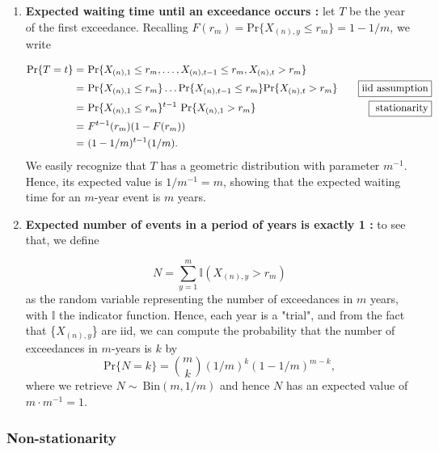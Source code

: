 \begin{enumerate}
	\item \textbf{Expected waiting time until an exceedance occurs :} let $T$ be the year of the first exceedance. Recalling $F(r_m) = \text{Pr} \big\{X_{(n),y}\leq r_m\big\}=1-1/m$, we write
	
	\begin{equation*}
	\begin{aligned}
	\text{Pr}\{T=t\}=\  & \text{Pr}\{X_{(n),1}\leq r_m,\dots,X_{(n),t-1}\leq r_m,X_{(n),t}>r_m\} \\
	=\ & \text{Pr}\{X_{(n),1}\leq r_m\}\dots\text{Pr}\{X_{(n),t-1}\leq r_m\}\text{Pr}\{X_{(n),t}>r_m\}&  \quad  \boxed{\textnormal{iid assumption}}\\
	= \ & \text{Pr}\{X_{(n),1}\leq r_m\}^{t-1}\ \text{Pr}\{X_{(n),1}>r_m\} &  \quad \boxed{\text{ stationarity}}\\
	=\ & F^{t-1}(r_m)(1-F(r_m))\\
	=\ & (1-1/m)^{t-1}(1/m).
	\end{aligned}
	\end{equation*}
	We easily recognize that $T$ has a geometric distribution with parameter $m^{-1}$. Hence, its expected value is $1/m^{-1}=m$, showing that the expected waiting time for an $m$-year event is $m$ years.
	
	\item \textbf{Expected number of events in a period of  years is exactly 1 :} to see that, we define  
	
	\begin{equation*}N=\sum_{y=1}^m \mathbb{I}(X_{(n),y}>r_m)
	\end{equation*}
	as the random variable representing the number of exceedances in $m$ years, with $\mathbb{I}$ the indicator function. Hence, each year is a "trial", and from the fact that \big\{$X_{(n),y}$\big\} are iid, we can compute the probability that the number of exceedances in $m$-years is $k$ by
	\begin{equation*}
	\text{Pr}\{N=k\}=\binom{m}{k}(1/m)^k(1-1/m)^{m-k},
	\end{equation*}
	where we retrieve $N\sim \ \text{Bin}(m,1/m)$ and hence $N$ has an expected value of $m\cdot m^{-1}=1$.
	
\end{enumerate}


\subsubsection*{Non-stationarity}

